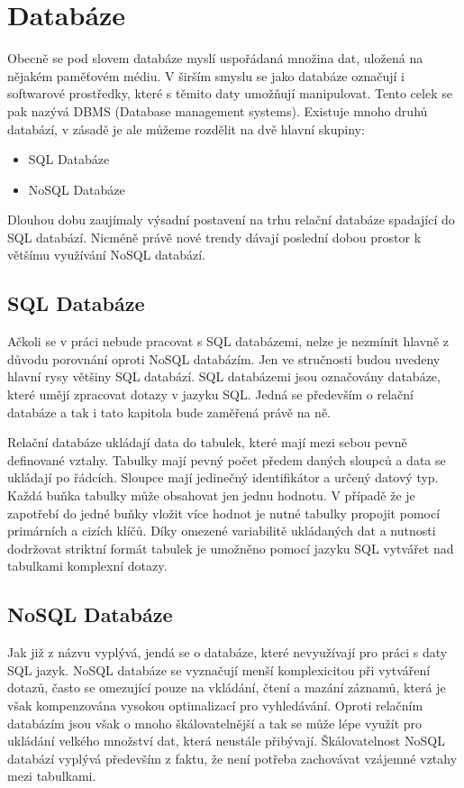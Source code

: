 \documentclass[thesis=M,czech]{FITthesis}[2012/06/26]
\begin{document}
\section{Databáze}
Obecně se pod slovem databáze myslí uspořádaná množina dat, uložená na nějakém paměťovém médiu. V širším smyslu se jako databáze označují i softwarové prostředky, které s těmito daty umožňují manipulovat. Tento celek se pak nazývá DBMS (Database management systems). Existuje mnoho druhů databází, v zásadě je ale můžeme rozdělit na dvě hlavní skupiny:

\begin{itemize}
\item SQL Databáze
\item NoSQL Databáze
\end{itemize}

Dlouhou dobu zaujímaly výsadní postavení na trhu relační databáze spadající do SQL databází. Nicméně právě nové trendy dávají poslední dobou prostor k většímu využívání NoSQL databází.

\subsection{SQL Databáze}
Ačkoli se v práci nebude pracovat s SQL databázemi, nelze je nezmínit hlavně z důvodu porovnání oproti NoSQL databázím. Jen ve stručnosti budou uvedeny hlavní rysy většiny SQL databází. SQL databázemi jsou označovány databáze, které umějí zpracovat dotazy v jazyku SQL. Jedná se především o relační databáze a tak i tato kapitola bude zaměřená právě na ně.

Relační databáze ukládají data do tabulek, které mají mezi sebou pevně definované vztahy. Tabulky mají pevný počet předem daných sloupců a data se ukládají po řádcích. Sloupce mají jedinečný identifikátor a určený datový typ. Každá buňka tabulky může obsahovat jen jednu hodnotu. V případě že je zapotřebí do jedné buňky vložit více hodnot je nutné tabulky propojit pomocí primárních a cizích klíčů. Díky omezené variabilitě ukládaných dat a nutnosti dodržovat striktní formát tabulek je umožněno pomocí jazyku SQL vytvářet nad tabulkami komplexní dotazy.


\subsection{NoSQL Databáze}
Jak již z názvu vyplývá, jendá se o databáze, které nevyužívají pro práci s daty SQL jazyk. NoSQL databáze se vyznačují menší komplexicitou při vytváření dotazů, často se omezující pouze na vkládání, čtení a mazání záznamů, která je však kompenzována vysokou optimalizací pro vyhledávání. Oproti relačním databázím jsou však o mnoho škálovatelnější a tak se může lépe využít pro ukládání velkého množství dat, která neustále přibývají. Škálovatelnost NoSQL databází vyplývá především z faktu, že není potřeba zachovávat vzájemné vztahy mezi tabulkami.
\end{document}
